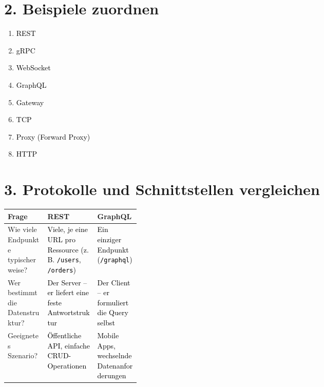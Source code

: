 \documentclass[11pt,a4paper]{article}
\newcommand{\solution}[1]{\textcolor{black}{#1}}
\begin{document}
\section*{2. Beispiele zuordnen}
\begin{enumerate}
  \item \solution{REST}
  \item \solution{gRPC}
  \item \solution{WebSocket}
  \item \solution{GraphQL}
  \item \solution{Gateway}
  \item \solution{TCP}
  \item \solution{Proxy (Forward Proxy)}
  \item \solution{HTTP}
\end{enumerate}

\section*{3. Protokolle und Schnittstellen vergleichen}

\begin{tabularx}{\linewidth}{|>{\raggedright\arraybackslash}p{0.30\linewidth}|>{\raggedright\arraybackslash}X|>{\raggedright\arraybackslash}X|}
\hline
\textbf{Frage} & \textbf{REST} & \textbf{GraphQL} \\
\hline
Wie viele Endpunkte typischerweise? & \solution{Viele, je eine URL pro Ressource (z.\,B. \texttt{/users}, \texttt{/orders})} & \solution{Ein einziger Endpunkt (\texttt{/graphql})} \\ \hline
Wer bestimmt die Datenstruktur? & \solution{Der Server – er liefert eine feste Antwortstruktur} & \solution{Der Client – er formuliert die Query selbst} \\ \hline
Geeignetes Szenario? & \solution{Öffentliche API, einfache CRUD-Operationen} & \solution{Mobile Apps, wechselnde Datenanforderungen} \\ \hline
\end{tabularx}

\vspace{1em}
\end{document}
